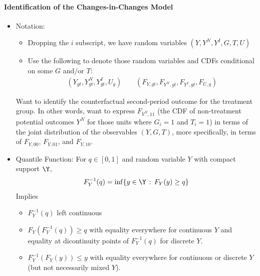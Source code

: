 \documentclass[12pt]{article}
\theoremstyle{plain}
\theoremstyle{definition}
\theoremstyle{remark}
\begin{document}
\paragraph{Identification of the Changes-in-Changes Model}
\begin{itemize}
  \item Notation:
    \begin{itemize}
      \item Dropping the $i$ subscript, we have
        random variables $(Y,Y^N,Y^I,G,T,U)$
      \item Use the following to denote those random variables
        and CDFs conditional on some $G$ and/or $T$:
        \begin{align*}
          (Y_{gt},Y_{gt}^N,Y_{gt}^I,U_g)
          \qquad
          (F_{Y,{gt}},F_{Y^N,{gt}},F_{Y^I,{gt}},F_{U,g})
        \end{align*}

    \end{itemize}
    Want to identify the counterfactual second-period outcome for the
    treatment group.
    In other words, want to express $F_{Y^N,11}$ (the CDF of
    non-treatment potential outcomes $Y^N$ for those units where
    $G_i=1$ and $T_i=1$) in terms of the joint distribution of the
    observables $(Y,G,T)$, more specifically, in terms of
    $F_{Y,00}$, $F_{Y,01}$, and $F_{Y,10}$.


  \item
    Quantile Function:
    For $q\in [0,1]$ and random variable $Y$ with compact support
    $\Y$,
    \begin{align*}
      F_Y^{-1}(q) = \inf \{y\in \Y\,:\, F_Y(y)\geq q\}
    \end{align*}
    Implies
    \begin{itemize}
      \item $F_Y^{-1}(q)$ left continuous
      \item $F_Y(F_Y^{-1}(q))\geq q$ with equality everywhere for
        continuous $Y$ and equality at dicontinuity points of
        $F_Y^{-1}(q)$ for discrete $Y$.
      \item $F_Y^{-1}(F_Y(y))\leq y$ with equality everywhere for
        continuous or discrete $Y$ (but not necessarily mixed $Y$).
    \end{itemize}


\end{itemize}
\end{document}
